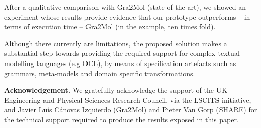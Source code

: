 \documentclass{llncs}
\begin{document}
After a qualitative comparison with Gra2Mol (state-of-the-art), we showed an experiment whose results provide evidence that our prototype outperforms -- in terms of execution time -- Gra2Mol (in the example, ten times fold).

Although there currently are limitations, the proposed solution makes a substantial step towards providing the required support for complex textual modelling languages (e.g OCL), by means of specification artefacts such as grammars, meta-models and domain specific transformations.

\vspace*{1mm}
\textbf{Acknowledgement.}
We gratefully acknowledge the support of the UK Engineering and Physical Sciences Research Council, via the LSCITS initiative, and Javier Lu\'{i}s C\'{a}novas Izquierdo (Gra2Mol) and Pieter Van Gorp (SHARE) for the technical support required to produce the results exposed in this paper.



\end{document}
